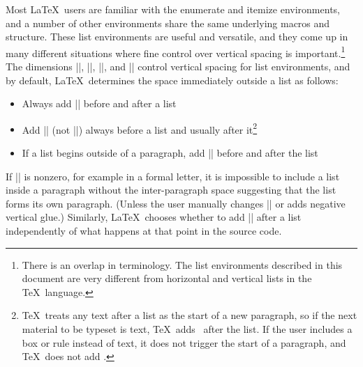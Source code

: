 \documentclass[12pt]{article}
\begin{document}
\def\documentname{User Guide}
\newdimen\MacroIndent


\noindent Most \LaTeX\ users are familiar with the enumerate and itemize environments, and a number of other environments share the same underlying macros and structure. These list environments are useful and versatile, and they come up in many different situations where fine control over vertical spacing is important.\footnote{There is an overlap in terminology. The list environments described in this document are very different from horizontal and vertical lists in the \TeX\ language.} The dimensions |\topsep|, |\parsep|, |\partopsep|, and |\itemsep| control vertical spacing for list environments, and by default, \LaTeX\ determines the space immediately outside a list as follows:
\begin{itemize}
\item Always add |\topsep| before and after a list
\item Add |\parskip| (not |\parsep|) always before a list and usually after it\footnote{\TeX\ treats any text after a list as the start of a new paragraph, so if the next material to be typeset is text, \TeX\ adds \vrb\parskip\ after the list. If the user includes a box or rule instead of text, it does not trigger the start of a paragraph, and \TeX\ does not add \vrb\parskip.}
\item If a list begins outside of a paragraph, add |\partopsep| before and after the list
\end{itemize}
If |\parskip| is nonzero, for example in a formal letter, it is impossible to include a list inside a paragraph without the inter-paragraph space suggesting that the list forms its own paragraph. (Unless the user manually changes |\parskip| or adds negative vertical glue.) Similarly, \LaTeX\ chooses whether to add |\partopsep| after a list independently of what happens at that point in the source code.
\end{document}
